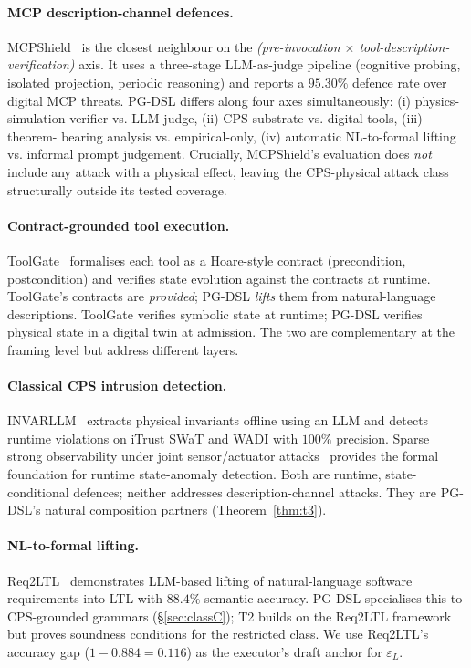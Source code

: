 \documentclass[11pt]{article}
\begin{document}
\paragraph{MCP description-channel defences.}
MCPShield~\cite{mcpshield2026} is the closest neighbour on the
\emph{(pre-invocation $\times$ tool-description-verification)} axis. It uses a
three-stage LLM-as-judge pipeline (cognitive probing, isolated projection,
periodic reasoning) and reports a $95.30\%$ defence rate over digital MCP
threats. PG-DSL differs along four axes simultaneously: (i) physics-simulation
verifier vs. LLM-judge, (ii) CPS substrate vs. digital tools, (iii) theorem-
bearing analysis vs. empirical-only, (iv) automatic NL-to-formal lifting vs.
informal prompt judgement. Crucially, MCPShield's evaluation does \emph{not}
include any attack with a physical effect, leaving the CPS-physical attack
class structurally outside its tested coverage.

\paragraph{Contract-grounded tool execution.}
ToolGate~\cite{toolgate2026} formalises each tool as a Hoare-style contract
(precondition, postcondition) and verifies state evolution against the
contracts at runtime. ToolGate's contracts are \emph{provided}; PG-DSL
\emph{lifts} them from natural-language descriptions. ToolGate verifies
symbolic state at runtime; PG-DSL verifies physical state in a digital twin
at admission. The two are complementary at the framing level but address
different layers.

\paragraph{Classical CPS intrusion detection.}
INVARLLM~\cite{invarllm2024} extracts physical invariants offline using an
LLM and detects runtime violations on iTrust SWaT and WADI with $100\%$
precision. Sparse strong observability under joint sensor/actuator
attacks~\cite{showkatbakhsh2019} provides the formal foundation for runtime
state-anomaly detection. Both are runtime, state-conditional defences;
neither addresses description-channel attacks. They are PG-DSL's natural
composition partners (Theorem~\ref{thm:t3}).

\paragraph{NL-to-formal lifting.}
Req2LTL~\cite{req2ltl2025} demonstrates LLM-based lifting of natural-language
software requirements into LTL with $88.4\%$ semantic accuracy.  PG-DSL
specialises this to CPS-grounded grammars (\S\ref{sec:classC}); T2 builds on
the Req2LTL framework but proves soundness conditions for the restricted
class. We use Req2LTL's accuracy gap ($1 - 0.884 = 0.116$) as the executor's
draft anchor for $\varepsilon_L$.
\end{document}
